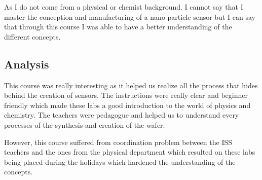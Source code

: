 As I do not come from a physical or chemist background. I cannot say that I master the conception and manufacturing of a nano-particle sensor but I can say that through this course I was able to have a better understanding of the different concepts.

\subsection{Analysis}

This course was really interesting as it helped us realize all the process that hides behind the creation of sensors. The instructions were really clear and beginner friendly which made these labs a good introduction to the world of physics and chemistry. The teachers were pedagogue and helped us to understand every processes of the synthesis and creation of the wafer.
\\\par
However, this course suffered from coordination problem between the ISS teachers and the ones from the physical department which resulted on these labs being placed during the holidays which hardened the understanding of the concepts.